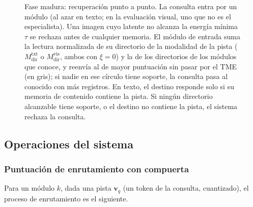 \begin{figure}[H]
{\begin{tikzpicture}
\end{tikzpicture}%
}
\caption[Fase madura: recuperación punto a punto]{Fase madura: recuperación punto a punto.
La consulta entra por un módulo (al azar en texto; en la evaluación visual, uno que no
es el especialista).
Una imagen cuyo latente no alcanza la energía mínima $\tau$ se rechaza antes de
cualquier memoria.
El módulo de entrada suma la lectura normalizada de su directorio de la modalidad de la
pista ($M^{\mathrm{txt}}_{\mathrm{dir}}$ o $M^{\mathrm{vis}}_{\mathrm{dir}}$, ambos con
$\xi{=}0$) y la de los directorios de los módulos que conoce, y reenvía al de mayor
puntuación sin pasar por el TME (en gris); si nadie en ese círculo tiene soporte, la
consulta pasa al conocido con más registros.
En texto, el destino responde solo si su memoria de contenido contiene la pista.
Si ningún directorio alcanzable tiene soporte, o el destino no contiene la pista, el
sistema rechaza la consulta.}
\label{fig:arq-madura}
\end{figure}

\subsection{Operaciones del sistema}
\label{sec:operaciones}

\subsubsection*{Puntuación de enrutamiento con compuerta}

Para un módulo $k$, dada una pista $\mathbf{v}_q$ (un token de la consulta, cuantizado),
el proceso de enrutamiento es el siguiente.

